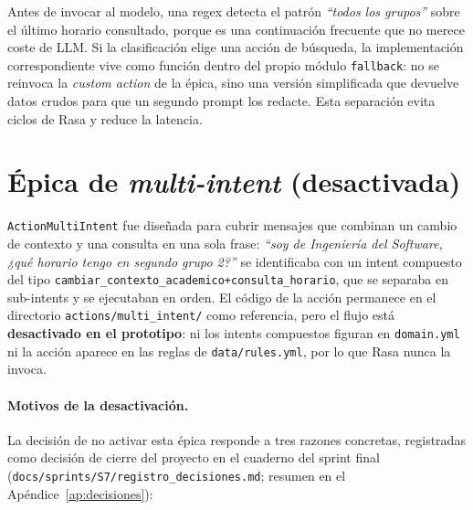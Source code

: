 Antes de invocar al modelo, una regex detecta el patrón \textit{``todos los grupos''} sobre el último horario consultado, porque es una continuación frecuente que no merece coste de LLM. Si la clasificación elige una acción de búsqueda, la implementación correspondiente vive como función dentro del propio módulo \texttt{fallback}: no se reinvoca la \textit{custom action} de la épica, sino una versión simplificada que devuelve datos crudos para que un segundo prompt los redacte. Esta separación evita ciclos de Rasa y reduce la latencia.

\section{Épica de \textit{multi-intent} (desactivada)}\label{sec:impl-multi-intent}

\texttt{ActionMultiIntent} fue diseñada para cubrir mensajes que combinan un cambio de contexto y una consulta en una sola frase: \textit{``soy de Ingeniería del Software, ¿qué horario tengo en segundo grupo 2?''} se identificaba con un intent compuesto del tipo \texttt{cambiar\_contexto\_academico+consulta\_horario}, que se separaba en sub-intents y se ejecutaban en orden. El código de la acción permanece en el directorio \texttt{actions/multi\_intent/} como referencia, pero el flujo está \textbf{desactivado en el prototipo}: ni los intents compuestos figuran en \texttt{domain.yml} ni la acción aparece en las reglas de \texttt{data/rules.yml}, por lo que Rasa nunca la invoca.

\paragraph{Motivos de la desactivación.} La decisión de no activar esta épica responde a tres razones concretas, registradas como decisión de cierre del proyecto en el cuaderno del sprint final (\texttt{docs/sprints/S7/registro\_decisiones.md}; resumen en el Apéndice~\ref{ap:decisiones}):

